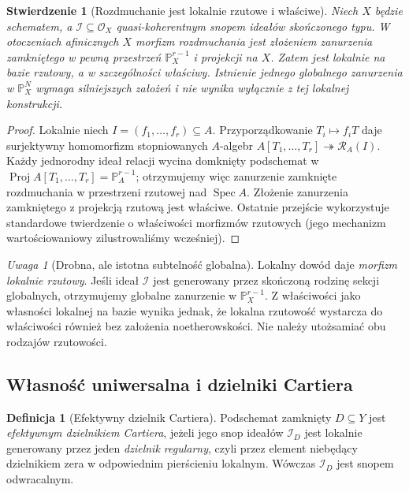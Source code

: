 \documentclass[11pt,a4paper,openany]{report}
\numberwithin{equation}{section}
\theoremstyle{plain}
\newtheorem{stwierdzenie}[twierdzenie]{Stwierdzenie}
\theoremstyle{definition}
\newtheorem{definicja}[twierdzenie]{Definicja}
\theoremstyle{remark}
\newtheorem{uwaga}[twierdzenie]{Uwaga}
\newcommand{\PP}{\mathbb P}
\newcommand{\Spec}{\operatorname{Spec}}
\begin{document}
\begin{stwierdzenie}[Rozdmuchanie jest lokalnie rzutowe i właściwe]
\label{st:ga5-blowup-proper}
Niech $X$ będzie schematem, a $\mathcal I\subseteq\mathcal O_X$
quasi-koherentnym snopem ideałów skończonego typu.
W otoczeniach afinicznych $X$ morfizm rozdmuchania jest
złożeniem zanurzenia zamkniętego w pewną przestrzeń
$\PP^{r-1}_X$ i projekcji na $X$. Zatem jest lokalnie
na bazie rzutowy, a w szczególności właściwy. Istnienie
jednego globalnego zanurzenia w $\PP^N_X$ wymaga
silniejszych założeń i nie wynika wyłącznie z tej lokalnej
konstrukcji.
\end{stwierdzenie}
\begin{proof}
Lokalnie niech $I=(f_1,\ldots,f_r)\subseteq A$.
Przyporządkowanie $T_i\mapsto f_iT$ daje surjektywny
homomorfizm stopniowanych $A$-algebr
$A[T_1,\ldots,T_r]\twoheadrightarrow\mathcal R_A(I)$.
Każdy jednorodny ideał relacji wycina domknięty
podschemat w $\operatorname{Proj}A[T_1,\ldots,T_r]
=\PP^{r-1}_A$; otrzymujemy więc zanurzenie zamknięte
rozdmuchania w przestrzeni rzutowej nad $\Spec A$.
Złożenie zanurzenia zamkniętego z projekcją rzutową
jest właściwe. Ostatnie przejście wykorzystuje standardowe
twierdzenie o właściwości morfizmów rzutowych (jego
mechanizm wartościowaniowy zilustrowaliśmy wcześniej).
\end{proof}

\begin{uwaga}[Drobna, ale istotna subtelność globalna]
Lokalny dowód daje \emph{morfizm lokalnie rzutowy}.
Jeśli ideał $\mathcal I$ jest generowany przez skończoną
rodzinę sekcji globalnych, otrzymujemy globalne zanurzenie
w $\PP^{r-1}_X$. Z właściwości jako własności lokalnej
na bazie wynika jednak, że lokalna rzutowość wystarcza
do właściwości również bez założenia noetherowskości.
Nie należy utożsamiać obu rodzajów rzutowości.
\end{uwaga}

\subsection{Własność uniwersalna i dzielniki Cartiera}

\begin{definicja}[Efektywny dzielnik Cartiera]
\label{def:ga5-cartier}
Podschemat zamknięty $D\subseteq Y$ jest \emph{efektywnym
dzielnikiem Cartiera}, jeżeli jego snop ideałów
$\mathcal I_D$ jest lokalnie generowany przez jeden
\emph{dzielnik regularny}, czyli przez element niebędący
dzielnikiem zera w odpowiednim pierścieniu lokalnym.
Wówczas $\mathcal I_D$ jest snopem odwracalnym.
\end{definicja}
\end{document}
